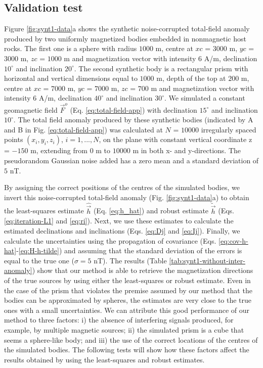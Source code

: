 \documentclass[journal abbreviation, npg]{copernicus}
\begin{document}
\subsection{Validation test}

Figure \ref{fig:synt1-data}a shows the synthetic noise-corrupted total-field anomaly produced by two uniformly magnetized bodies embedded in nonmagnetic host rocks. The first one is a sphere with radius $1000$ m, centre at $xc$ = $3000$ m, $yc$ = $3000$ m, $zc$ = $1000$ m and magnetization vector with intensity $6$ A/m, declination $10^{\circ}$ and inclination $20^{\circ}$. The second synthetic body is a rectangular prism with horizontal and vertical dimensions equal to $1000$ m, depth of the top at $200$ m, centre at $xc$ = $7000$ m, $yc$ = $7000$ m, $zc$ = $700$ m and magnetization vector with intensity $6$ A/m, declination $40^{\circ}$ and inclination $30^{\circ}$. We simulated a constant geomagnetic field $\vec{F}^{o}$ (Eq. \ref{eq:total-field-app}) with declination $15^{\circ}$ and inclination $10^{\circ}$. The total field anomaly produced by these synthetic bodies (indicated by A and B in Fig. \ref{eq:total-field-app}) was calculated at $N$ = $10000$ irregularly spaced points $(x_{i}, y_{i}, z_{i})$, $i = 1, ..., N$, on the plane with constant vertical coordinate z = $-150$ m, extending from $0$ m to $10000$ m in both x- and y-directions. The pseudorandom Gaussian noise added has a zero mean and a standard deviation of $5$ nT. 

By assigning the correct positions of the centres of the simulated bodies, we invert this noise-corrupted total-field anomaly (Fig. \ref{fig:synt1-data}a) to obtain the least-squares estimate $\hat{\vec{h}}$ (Eq. \ref{eq:h_hat}) and robust estimate $\tilde{\vec{h}}$ (Eqs. \ref{eq:iteration-L1} and \ref{eq:ri}). Next, we use these estimates to calculate the estimated declinations and inclinations (Eqs. \ref{eq:Dj} and \ref{eq:Ij}). Finally, we calculate the uncertainties using the propagation of covariance (Eqs. \ref{eq:cov-h-hat}-\ref{eq:H-h-tilde}) and assuming that the standard deviation of the errors is equal to the true one ($\sigma = 5$ nT). The results (Table \ref{tab:synt1-without-inter-anomaly}) show that our method is able to retrieve the magnetization directions of the true sources by using either the least-squares or robust estimate. Even in the case of the prism that violates the premise assumed by our method that the bodies can be approximated by spheres,  the estimates are very close to the true ones with a small uncertainties. We can attribute this good performance of our method to three factors: i) the absence of interfering signals produced, for example, by multiple magnetic sources; ii) the simulated prism is a cube that seems a sphere-like body; and iii) the use of the  correct locations of the centres of the simulated bodies. The following tests will show how these factors affect the results obtained by using the least-squares and robust estimates.
\end{document}
